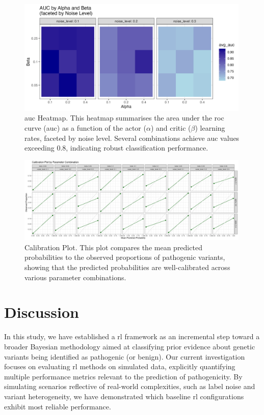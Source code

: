 \begin{figure}[h]
    \centering
    \includegraphics[width=0.99\textwidth]{../figures/auc.png}
    \caption{\ac{auc} Heatmap. This heatmap summarises the area under the \ac{roc} curve  (\ac{auc}) as a function of the actor ($\alpha$) and critic ($\beta$) learning rates, faceted by noise level. Several combinations achieve \ac{auc} values exceeding 0.8, indicating robust classification performance.}
    \label{fig:auc}
\end{figure}

\begin{figure}[h]
    \centering
    \includegraphics[width=0.99\textwidth]{../figures/calibration.png}
    \caption{Calibration Plot. This plot compares the mean predicted probabilities to the observed proportions of pathogenic variants, showing that the predicted probabilities are well-calibrated across various parameter combinations.}
    \label{fig:calibration}
\end{figure}

\clearpage


\section{Discussion}
In this study, we have established a \ac{rl} framework as an incremental step toward a broader Bayesian methodology aimed at classifying prior evidence about genetic variants being identified as pathogenic (or benign). Our current investigation focuses on evaluating \ac{rl} methods on simulated data, explicitly quantifying multiple performance metrics relevant to the prediction of pathogenicity. By simulating scenarios reflective of real-world complexities, such as label noise and variant heterogeneity, we have demonstrated which baseline \ac{rl} configurations exhibit most reliable performance.

